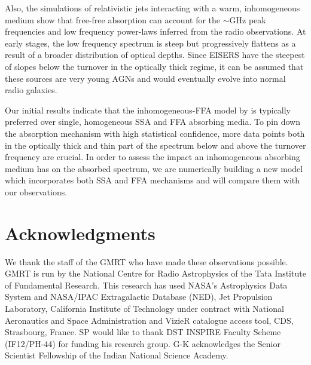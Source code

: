 \documentclass[proof]{WileyASNA-v1}
\begin{document}
Also, the simulations of relativistic jets interacting with a warm, inhomogeneous medium \citep{Mukherjee2016,Bicknell2018} show that free-free absorption can account for the $\sim$GHz peak frequencies and low frequency power-laws inferred from the radio observations. %
At early stages, the low frequency spectrum is steep but progressively flattens as a result of a broader distribution of optical depths. %
Since EISERS have the steepest of slopes below the turnover in the optically thick regime, it can be assumed that these sources are very young AGNs and would eventually evolve into normal radio galaxies.

Our initial results indicate that the inhomogeneous-FFA model by \citep{Bicknell1997} is  typically preferred  over  single,  homogeneous SSA and FFA absorbing media.  To pin down the absorption mechanism with high statistical  confidence,  more  data  points  both  in  the  optically thick and thin part of the spectrum below and above the turnover frequency are crucial.  In order to  assess  the  impact  an  inhomogeneous  absorbing medium has on the absorbed spectrum, we are numerically building a new model which incorporates both SSA and FFA mechanisms and will compare them with our observations. 

\section*{Acknowledgments}

We thank the staff of the GMRT who have made these observations possible. GMRT is run by the National Centre for Radio Astrophysics of the Tata Institute of Fundamental Research. This research has used NASA's Astrophysics Data System and NASA/IPAC Extragalactic Database (NED), Jet Propulsion Laboratory, California Institute of Technology under contract with National Aeronautics and Space Administration and VizieR catalogue access tool, CDS, Strasbourg, France. SP would like to thank DST INSPIRE Faculty Scheme (IF12/PH-44) for funding his research group. G-K acknowledges the Senior Scientist Fellowship of the Indian National Science Academy.

\end{document}
